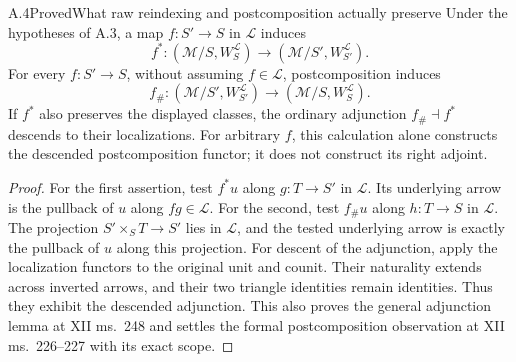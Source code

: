 \begin{claim}{A.4}{Proved}{What raw reindexing and postcomposition actually preserve}
Under the hypotheses of A.3, a map $f:S'\to S$ in $\mathcal L$ induces
\[
f^*:(\mathcal M/S,W_S^{\mathcal L})\longrightarrow
(\mathcal M/S',W_{S'}^{\mathcal L}).
\]
For every $f:S'\to S$, without assuming $f\in\mathcal L$, postcomposition induces
\[
f_\#:(\mathcal M/S',W_{S'}^{\mathcal L})\longrightarrow
(\mathcal M/S,W_S^{\mathcal L}).
\]
If $f^*$ also preserves the displayed classes, the ordinary adjunction $f_\#\dashv f^*$ descends to their localizations. For arbitrary $f$, this calculation alone constructs the descended postcomposition functor; it does not construct its right adjoint.
\end{claim}
\begin{proof}
For the first assertion, test $f^*u$ along $g:T\to S'$ in $\mathcal L$. Its underlying arrow is the pullback of $u$ along $fg\in\mathcal L$. For the second, test $f_\#u$ along $h:T\to S$ in $\mathcal L$. The projection $S'\times_S T\to S'$ lies in $\mathcal L$, and the tested underlying arrow is exactly the pullback of $u$ along this projection. For descent of the adjunction, apply the localization functors to the original unit and counit. Their naturality extends across inverted arrows, and their two triangle identities remain identities. Thus they exhibit the descended adjunction. This also proves the general adjunction lemma at XII ms.~248 and settles the formal postcomposition observation at XII ms.~226--227 with its exact scope.
\end{proof}


